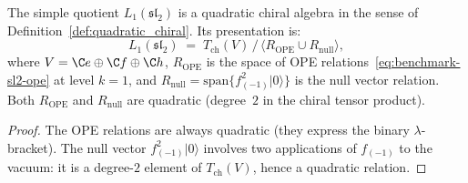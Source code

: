 \begin{proposition}
\label{prop:L1-quadratic}
The simple quotient $L_1(\mathfrak{sl}_2)$ is a quadratic
chiral algebra in the sense of
Definition~\textup{\ref{def:quadratic_chiral}}. Its
presentation is:
\begin{equation}\label{eq:L1-presentation}
 L_1(\mathfrak{sl}_2)
 \;=\;
 T_{\mathrm{ch}}(V) \,/\,
 \bigl\langle
 R_{\mathrm{OPE}} \cup R_{\mathrm{null}}
 \bigr\rangle,
\end{equation}
where $V = \C e \oplus \C f \oplus \C h$,
$R_{\mathrm{OPE}}$ is the space of OPE
relations~\eqref{eq:benchmark-sl2-ope} at level $k = 1$, and
$R_{\mathrm{null}} = \mathrm{span}\{f_{(-1)}^2 |0\rangle\}$
is the null vector relation. Both $R_{\mathrm{OPE}}$ and
$R_{\mathrm{null}}$ are quadratic
\textup{(}degree~$2$ in the chiral tensor product\textup{)}.
\end{proposition}

\begin{proof}
The OPE relations are always quadratic (they express the
binary $\lambda$-bracket). The null vector
$f_{(-1)}^2 |0\rangle$ involves two applications of $f_{(-1)}$
to the vacuum: it is a degree-$2$ element of
$T_{\mathrm{ch}}(V)$, hence a quadratic relation.
\end{proof}

